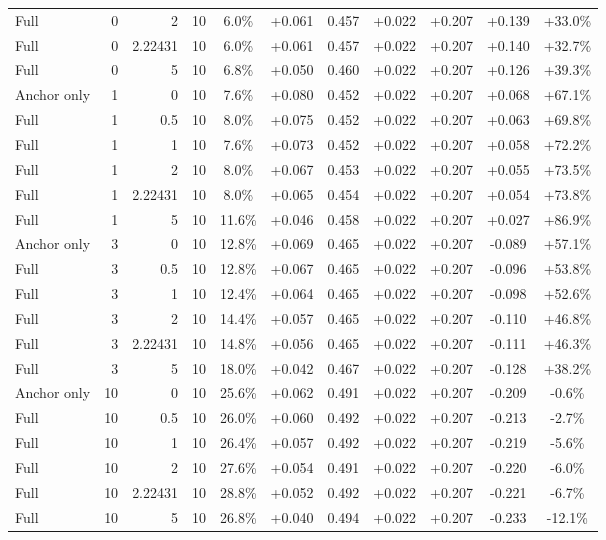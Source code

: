 \begin{table}[htbp]
\begin{tabular}{lrrrccccccc}
Full & 0 & 2 & 10 & 6.0\% & +0.061 & 0.457 & +0.022 & +0.207 & +0.139 & +33.0\% \\
Full & 0 & 2.22431 & 10 & 6.0\% & +0.061 & 0.457 & +0.022 & +0.207 & +0.140 & +32.7\% \\
Full & 0 & 5 & 10 & 6.8\% & +0.050 & 0.460 & +0.022 & +0.207 & +0.126 & +39.3\% \\
Anchor only & 1 & 0 & 10 & 7.6\% & +0.080 & 0.452 & +0.022 & +0.207 & +0.068 & +67.1\% \\
Full & 1 & 0.5 & 10 & 8.0\% & +0.075 & 0.452 & +0.022 & +0.207 & +0.063 & +69.8\% \\
Full & 1 & 1 & 10 & 7.6\% & +0.073 & 0.452 & +0.022 & +0.207 & +0.058 & +72.2\% \\
Full & 1 & 2 & 10 & 8.0\% & +0.067 & 0.453 & +0.022 & +0.207 & +0.055 & +73.5\% \\
Full & 1 & 2.22431 & 10 & 8.0\% & +0.065 & 0.454 & +0.022 & +0.207 & +0.054 & +73.8\% \\
Full & 1 & 5 & 10 & 11.6\% & +0.046 & 0.458 & +0.022 & +0.207 & +0.027 & +86.9\% \\
Anchor only & 3 & 0 & 10 & 12.8\% & +0.069 & 0.465 & +0.022 & +0.207 & -0.089 & +57.1\% \\
Full & 3 & 0.5 & 10 & 12.8\% & +0.067 & 0.465 & +0.022 & +0.207 & -0.096 & +53.8\% \\
Full & 3 & 1 & 10 & 12.4\% & +0.064 & 0.465 & +0.022 & +0.207 & -0.098 & +52.6\% \\
Full & 3 & 2 & 10 & 14.4\% & +0.057 & 0.465 & +0.022 & +0.207 & -0.110 & +46.8\% \\
Full & 3 & 2.22431 & 10 & 14.8\% & +0.056 & 0.465 & +0.022 & +0.207 & -0.111 & +46.3\% \\
Full & 3 & 5 & 10 & 18.0\% & +0.042 & 0.467 & +0.022 & +0.207 & -0.128 & +38.2\% \\
Anchor only & 10 & 0 & 10 & 25.6\% & +0.062 & 0.491 & +0.022 & +0.207 & -0.209 & -0.6\% \\
Full & 10 & 0.5 & 10 & 26.0\% & +0.060 & 0.492 & +0.022 & +0.207 & -0.213 & -2.7\% \\
Full & 10 & 1 & 10 & 26.4\% & +0.057 & 0.492 & +0.022 & +0.207 & -0.219 & -5.6\% \\
Full & 10 & 2 & 10 & 27.6\% & +0.054 & 0.491 & +0.022 & +0.207 & -0.220 & -6.0\% \\
Full & 10 & 2.22431 & 10 & 28.8\% & +0.052 & 0.492 & +0.022 & +0.207 & -0.221 & -6.7\% \\
Full & 10 & 5 & 10 & 26.8\% & +0.040 & 0.494 & +0.022 & +0.207 & -0.233 & -12.1\% \\

\end{tabular}
\end{table}
